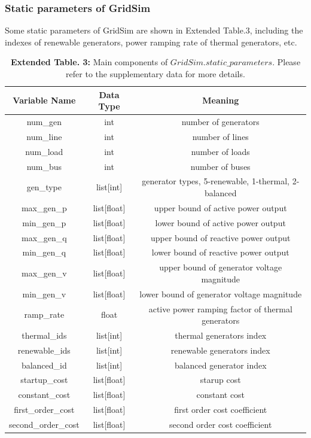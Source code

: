 \subsubsection*{Static parameters of GridSim}
Some static parameters of GridSim are shown in Extended Table.3, including the indexes of renewable generators, power ramping rate of thermal generators, etc. 
\begin{table}[h]
    \centering
    \begin{tiny}
    \begin{tabular}{ccc}
    \toprule
        Variable Name & Data Type & Meaning \\
    \midrule
        num\_gen & int & number of generators \\
        num\_line & int & number of lines \\ 
        num\_load & int & number of loads \\
        num\_bus & int & number of buses \\
        gen\_type & list[int] & generator types, 5-renewable, 1-thermal, 2-balanced\\
        max\_gen\_p & list[float] & upper bound of active power output \\
        min\_gen\_p & list[float] & lower bound of active power output \\
        max\_gen\_q & list[float] & upper bound of reactive power output \\
        min\_gen\_q & list[float] & lower bound of reactive power output \\
        max\_gen\_v & list[float] & upper bound of generator voltage magnitude \\
        min\_gen\_v & list[float] & lower bound of generator voltage magnitude \\
        ramp\_rate & float & active power ramping factor of thermal generators \\
        thermal\_ids & list[int] & thermal generators index \\
        renewable\_ids & list[int] & renewable generators index \\
        balanced\_id & list[int] & balanced generator index\\
        startup\_cost & list[float] & starup cost\\
        constant\_cost & list[float] & constant cost \\
        first\_order\_cost & list[float] & first order cost coefficient \\
        second\_order\_cost & list[float] & second order cost coefficient\\
    \bottomrule
    \end{tabular}
    \captionsetup{labelformat=empty}
    \caption{\textbf{Extended Table. 3:} Main components of $GridSim.static\_parameters$. Please refer to the supplementary data for more details.}
    \end{tiny}
    \label{tab:observation}
\end{table}

